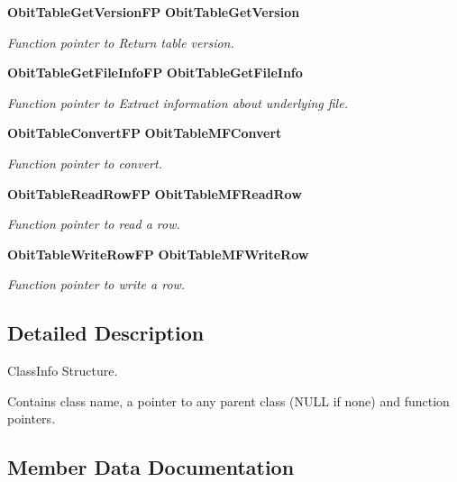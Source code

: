 \begin{CompactItemize}
{\bf Obit\-Table\-Get\-Version\-FP} {\bf Obit\-Table\-Get\-Version}
\begin{CompactList}\small\item\em Function pointer to Return table version. \item\end{CompactList}\item 
{\bf Obit\-Table\-Get\-File\-Info\-FP} {\bf Obit\-Table\-Get\-File\-Info}
\begin{CompactList}\small\item\em Function pointer to Extract information about underlying file. \item\end{CompactList}\item 
{\bf Obit\-Table\-Convert\-FP} {\bf Obit\-Table\-MFConvert}
\begin{CompactList}\small\item\em Function pointer to convert. \item\end{CompactList}\item 
{\bf Obit\-Table\-Read\-Row\-FP} {\bf Obit\-Table\-MFRead\-Row}
\begin{CompactList}\small\item\em Function pointer to read a row. \item\end{CompactList}\item 
{\bf Obit\-Table\-Write\-Row\-FP} {\bf Obit\-Table\-MFWrite\-Row}
\begin{CompactList}\small\item\em Function pointer to write a row. \item\end{CompactList}\end{CompactItemize}


\subsection{Detailed Description}
Class\-Info Structure. 

Contains class name, a pointer to any parent class (NULL if none) and function pointers. 



\subsection{Member Data Documentation}
